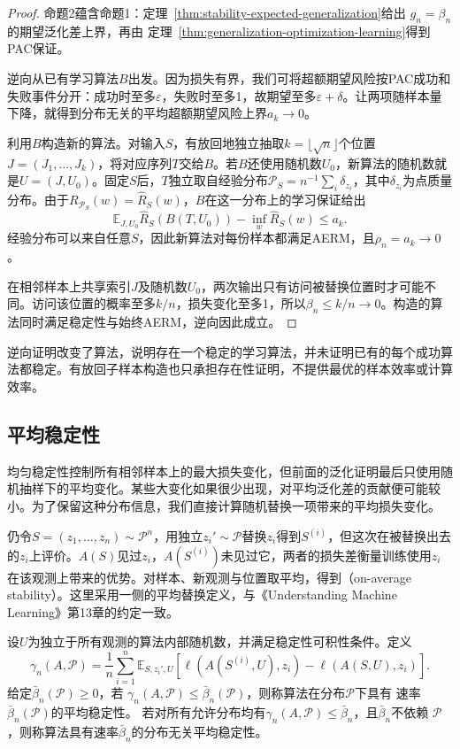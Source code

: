 \begin{proof}
命题2蕴含命题1：定理~\ref{thm:stability-expected-generalization}给出
$g_n=\beta_n$的期望泛化差上界，再由
定理~\ref{thm:generalization-optimization-learning}得到PAC保证。

逆向从已有学习算法$B$出发。因为损失有界，我们可将超额期望风险按PAC成功和失败事件分开：成功时至多$\varepsilon$，失败时至多1，故期望至多$\varepsilon+\delta$。让两项随样本量下降，就得到分布无关的平均超额期望风险上界$a_k\to0$。

利用$B$构造新的算法。对输入$S$，有放回地独立抽取$k=\lfloor\sqrt n\rfloor$个位置$J=(J_1,\ldots,J_k)$，将对应序列$T$交给$B$。若$B$还使用随机数$U_0$，新算法的随机数就是$U=(J,U_0)$。固定$S$后，$T$独立取自经验分布$\mathcal P_S=n^{-1}\sum_i\delta_{z_i}$，其中$\delta_{z_i}$为点质量分布。由于$R_{\mathcal P_S}(w)=\hat R_S(w)$，$B$在这一分布上的学习保证给出
\[
 \mathbb E_{J,U_0}\hat R_S(B(T,U_0))-\inf_w\hat R_S(w)\leq a_k.
\]
经验分布可以来自任意$S$，因此新算法对每份样本都满足AERM，且$\rho_n=a_k\to0$。

在相邻样本上共享索引$J$及随机数$U_0$，两次输出只有访问被替换位置时才可能不同。访问该位置的概率至多$k/n$，损失变化至多1，所以$\beta_n\leq k/n\to0$。构造的算法同时满足稳定性与始终AERM，逆向因此成立。
\end{proof}

逆向证明改变了算法，说明存在一个稳定的学习算法，并未证明已有的每个成功算法都稳定。有放回子样本构造也只承担存在性证明，不提供最优的样本效率或计算效率。

\subsection{平均稳定性}
\label{sec:on-average-stability}

均匀稳定性控制所有相邻样本上的最大损失变化，但前面的泛化证明最后只使用随机抽样下的平均变化。某些大变化如果很少出现，对平均泛化差的贡献便可能较小。为了保留这种分布信息，我们直接计算随机替换一项带来的平均损失变化。

仍令$S=(z_1,\ldots,z_n)\sim\mathcal P^n$，用独立$z_i'\sim\mathcal P$替换$z_i$得到$S^{(i)}$，但这次在被替换出去的$z_i$上评价。$A(S)$见过$z_i$，$A(S^{(i)})$未见过它，两者的损失差衡量训练使用$z_i$在该观测上带来的优势。对样本、新观测与位置取平均，得到（on-average stability）。这里采用一侧的平均替换定义，与《Understanding Machine Learning》第13章的约定一致。

\begin{definition}[平均稳定性]
\label{def:on-average-stability}
设$U$为独立于所有观测的算法内部随机数，并满足稳定性可积性条件。定义
\begin{equation}
 \gamma_n(A,\mathcal P)
 =\frac1n\sum_{i=1}^n\mathbb E_{S,z_i',U}
 \left[\ell(A(S^{(i)},U),z_i)-\ell(A(S,U),z_i)\right].
 \label{eq:on-average-stability}
\end{equation}
给定$\bar\beta_n(\mathcal P)\geq0$，若
$\gamma_n(A,\mathcal P)\leq\bar\beta_n(\mathcal P)$，则称算法在分布$\mathcal P$下具有
速率$\bar\beta_n(\mathcal P)$的平均稳定性。
若对所有允许分布均有$\gamma_n(A,\mathcal P)\leq\bar\beta_n$，且$\bar\beta_n$不依赖
$\mathcal P$，则称算法具有速率$\bar\beta_n$的分布无关平均稳定性。
\end{definition}

